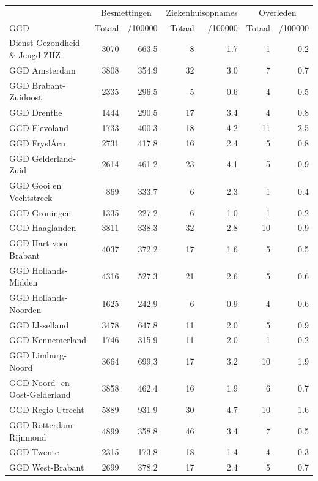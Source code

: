 \documentclass[
  english,
  man,floatsintext]{apa6}
\begin{document}
\begin{table}
\centering\begingroup\fontsize{10}{12}\selectfont

\begin{threeparttable}
\begin{tabular}{lrrrrrr}
\toprule
\multicolumn{1}{c}{ } & \multicolumn{2}{c}{Besmettingen} & \multicolumn{2}{c}{Ziekenhuisopnames} & \multicolumn{2}{c}{Overleden} \\
\cmidrule(l{3pt}r{3pt}){2-3} \cmidrule(l{3pt}r{3pt}){4-5} \cmidrule(l{3pt}r{3pt}){6-7}
GGD & Totaal & /100000 & Totaal & /100000 & Totaal & /100000\\
\midrule
Dienst Gezondheid \& Jeugd ZHZ & 3070 & 663.5 & 8 & 1.7 & 1 & 0.2\\
GGD Amsterdam & 3808 & 354.9 & 32 & 3.0 & 7 & 0.7\\
GGD Brabant-Zuidoost & 2335 & 296.5 & 5 & 0.6 & 4 & 0.5\\
GGD Drenthe & 1444 & 290.5 & 17 & 3.4 & 4 & 0.8\\
GGD Flevoland & 1733 & 400.3 & 18 & 4.2 & 11 & 2.5\\
GGD FryslÃ¢n & 2731 & 417.8 & 16 & 2.4 & 5 & 0.8\\
GGD Gelderland-Zuid & 2614 & 461.2 & 23 & 4.1 & 5 & 0.9\\
GGD Gooi en Vechtstreek & 869 & 333.7 & 6 & 2.3 & 1 & 0.4\\
GGD Groningen & 1335 & 227.2 & 6 & 1.0 & 1 & 0.2\\
GGD Haaglanden & 3811 & 338.3 & 32 & 2.8 & 10 & 0.9\\
GGD Hart voor Brabant & 4037 & 372.2 & 17 & 1.6 & 5 & 0.5\\
GGD Hollands-Midden & 4316 & 527.3 & 21 & 2.6 & 5 & 0.6\\
GGD Hollands-Noorden & 1625 & 242.9 & 6 & 0.9 & 4 & 0.6\\
GGD IJsselland & 3478 & 647.8 & 11 & 2.0 & 5 & 0.9\\
GGD Kennemerland & 1746 & 315.9 & 11 & 2.0 & 1 & 0.2\\
GGD Limburg-Noord & 3664 & 699.3 & 17 & 3.2 & 10 & 1.9\\
GGD Noord- en Oost-Gelderland & 3858 & 462.4 & 16 & 1.9 & 6 & 0.7\\
GGD Regio Utrecht & 5889 & 931.9 & 30 & 4.7 & 10 & 1.6\\
GGD Rotterdam-Rijnmond & 4899 & 358.8 & 46 & 3.4 & 7 & 0.5\\
GGD Twente & 2315 & 173.8 & 18 & 1.4 & 4 & 0.3\\
GGD West-Brabant & 2699 & 378.2 & 17 & 2.4 & 5 & 0.7\\

\end{tabular}
\end{threeparttable}
\end{table}
\end{document}
